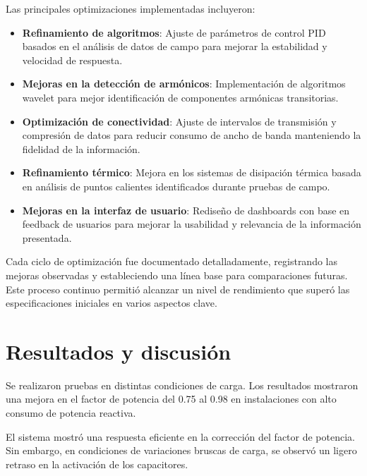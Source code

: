 \documentclass{report}          %
\begin{document}
            Las principales optimizaciones implementadas incluyeron:
            
            \begin{itemize}
                \item \textbf{Refinamiento de algoritmos}: Ajuste de parámetros de control PID basados en el análisis de datos de campo para mejorar la estabilidad y velocidad de respuesta.
                
                \item \textbf{Mejoras en la detección de armónicos}: Implementación de algoritmos wavelet para mejor identificación de componentes armónicas transitorias.
                
                \item \textbf{Optimización de conectividad}: Ajuste de intervalos de transmisión y compresión de datos para reducir consumo de ancho de banda manteniendo la fidelidad de la información.
                
                \item \textbf{Refinamiento térmico}: Mejora en los sistemas de disipación térmica basada en análisis de puntos calientes identificados durante pruebas de campo.
                
                \item \textbf{Mejoras en la interfaz de usuario}: Rediseño de dashboards con base en feedback de usuarios para mejorar la usabilidad y relevancia de la información presentada.
            \end{itemize}
            
            Cada ciclo de optimización fue documentado detalladamente, registrando las mejoras observadas y estableciendo una línea base para comparaciones futuras. Este proceso continuo permitió alcanzar un nivel de rendimiento que superó las especificaciones iniciales en varios aspectos clave.

    \chapter{Resultados y discusión}
        Se realizaron pruebas en distintas condiciones de carga. Los resultados mostraron una mejora en el factor de potencia del 0.75 al 0.98 en instalaciones con alto consumo de potencia reactiva. \par
        El sistema mostró una respuesta eficiente en la corrección del factor de potencia. Sin embargo, en condiciones de variaciones bruscas de carga, se observó un ligero retraso en la activación de los capacitores.
\end{document}
